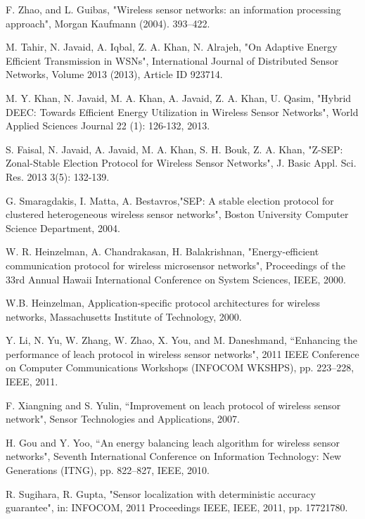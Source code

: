 \documentclass[journal]{IEEEtran}
\begin{document}
\begin{thebibliography}{9}
 F. Zhao, and L. Guibas, "Wireless sensor networks: an information processing approach", Morgan Kaufmann (2004).
393–422.

 M. Tahir, N. Javaid, A. Iqbal, Z. A. Khan, N. Alrajeh, "On Adaptive Energy Efficient Transmission in WSNs", International Journal of Distributed Sensor Networks, Volume 2013 (2013), Article ID 923714.

 M. Y. Khan, N. Javaid, M. A. Khan, A. Javaid, Z. A. Khan, U. Qasim, "Hybrid DEEC: Towards Efficient Energy Utilization in Wireless Sensor Networks", World Applied Sciences Journal 22 (1): 126-132, 2013.

 S. Faisal, N. Javaid, A. Javaid, M. A. Khan, S. H. Bouk, Z. A. Khan, "Z-SEP: Zonal-Stable Election Protocol for Wireless Sensor Networks", J. Basic Appl. Sci. Res. 2013 3(5): 132-139.

 G. Smaragdakis, I. Matta, A. Bestavros,"SEP: A stable election protocol for clustered heterogeneous wireless sensor networks", Boston University Computer Science Department, 2004.

 W. R. Heinzelman, A. Chandrakasan, H. Balakrishnan, "Energy-efficient communication protocol for wireless microsensor networks", Proceedings of the 33rd Annual Hawaii International Conference on System Sciences, IEEE, 2000.

 W.B. Heinzelman, Application-specific protocol architectures for wireless networks, Massachusetts Institute of Technology, 2000.

 Y. Li, N. Yu, W. Zhang, W. Zhao, X. You, and M. Daneshmand, “Enhancing the performance of leach protocol in wireless sensor networks", 2011 IEEE Conference on Computer Communications Workshops (INFOCOM WKSHPS), pp. 223–228, IEEE, 2011.

 F. Xiangning and S. Yulin, “Improvement on leach protocol of wireless sensor network", Sensor Technologies and Applications, 2007.

 H. Gou and Y. Yoo, “An energy balancing leach algorithm for wireless sensor networks", Seventh International Conference on Information Technology: New Generations
(ITNG), pp. 822–827, IEEE, 2010.

 R. Sugihara, R. Gupta, "Sensor localization with deterministic accuracy guarantee",  in: INFOCOM, 2011 Proceedings IEEE, IEEE, 2011, pp. 17721780.


\end{thebibliography}
\end{document}
